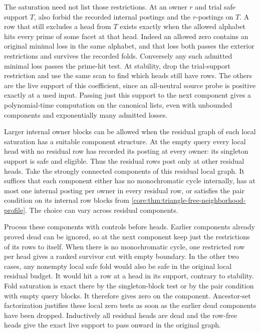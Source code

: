 The saturation need not list those restrictions.
At an owner $r$ and trial safe support $T$, also
forbid the recorded internal postings and the
$r$-postings on $T$. A row that still excludes a head
from $T$ exists exactly when the allowed alphabet
hits every prime of some facet at that head. Indeed
an allowed zero contains an original minimal loss
in the same alphabet, and that loss both passes
the exterior restrictions and survives the recorded
folds. Conversely any such admitted minimal loss
passes the prime-hit test. At stability, drop the
trial-support restriction and use the same scan to
find which heads still have rows. The others are
the live support of this coefficient, since an
all-neutral source probe is positive exactly at a
used input. Passing just this support to the next
component gives a polynomial-time computation on
the canonical lists, even with unbounded components
and exponentially many admitted losses.

Larger internal owner blocks can be allowed when the
residual graph of each local saturation has a suitable
component structure. At the empty query every local head
with no residual row has recorded its posting at every
owner: its singleton support is safe and eligible. Thus
the residual rows post only at other residual heads.
Take the strongly connected components of this residual
local graph. It suffices that each component either has
no monochromatic cycle internally, has at most one
internal posting per owner in every residual row, or
satisfies the pair condition on its internal row blocks
from \cref{core:thm:triangle-free-neighborhood-profile}.
The choice can vary across residual components.

Process these components with controls before heads.
Earlier components already proved dead can be ignored,
so at the next component keep just the restrictions of
its rows to itself. When there is no monochromatic
cycle, one restricted row per head gives a ranked
survivor cut with empty boundary. In the other two
cases, any nonempty local safe fold would also be safe
in the original local residual budget. It would hit a
row at a head in its support, contrary to stability.
Fold saturation is exact there by the singleton-block
test or by the pair condition with empty query blocks.
It therefore gives zero on the component. Ancestor-set factorization justifies
these local zero tests as soon as the earlier dead
components have been dropped. Inductively all residual
heads are dead and the row-free heads give the exact
live support to pass onward in the original graph.

